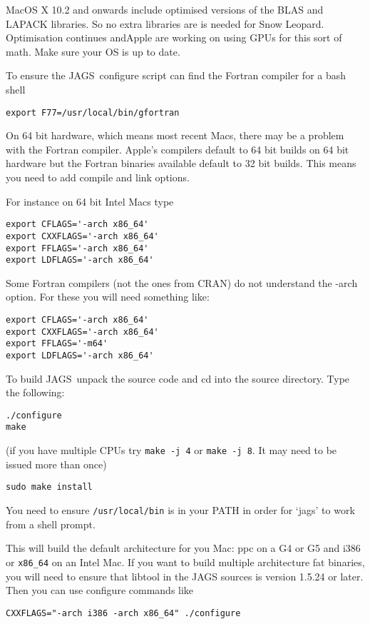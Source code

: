 \documentclass[11pt, a4paper, titlepage]{article}
\newcommand{\JAGS}{\textsf{JAGS}}
\begin{document}
MacOS X 10.2 and onwards include optimised versions of the BLAS and
LAPACK libraries.  So no extra libraries are is needed for Snow
Leopard.  Optimisation continues andApple are working on using GPUs
for this sort of math.  Make sure your OS is up to date.

To ensure the \JAGS\ configure script can find the Fortran compiler
for a bash shell
\begin{verbatim}
export F77=/usr/local/bin/gfortran
\end{verbatim}

On 64 bit hardware, which means most recent Macs, there may be a 
problem with the Fortran compiler.  Apple's compilers default to 64 bit 
builds on 64 bit hardware but the Fortran binaries available default to 
32 bit builds. This means you need to add compile and link options.

For instance on 64 bit Intel Macs type
\begin{verbatim}
export CFLAGS='-arch x86_64'
export CXXFLAGS='-arch x86_64'
export FFLAGS='-arch x86_64'
export LDFLAGS='-arch x86_64'
\end{verbatim}

Some Fortran compilers (not the ones from CRAN) do not understand 
the -arch option. For these you will need something like:
\begin{verbatim}
export CFLAGS='-arch x86_64'
export CXXFLAGS='-arch x86_64'
export FFLAGS='-m64'
export LDFLAGS='-arch x86_64'
\end{verbatim}

To build \JAGS\ unpack the source code and cd into the source  
directory. Type the following:
\begin{verbatim}
./configure
make
\end{verbatim}
(if you have multiple CPUs try \verb+make -j 4+ or
\verb+make -j 8+. It may need to be issued more than once)
\begin{verbatim}
sudo make install
\end{verbatim}

You need to ensure \texttt{/usr/local/bin} is in your PATH in order
for `jags' to work from a shell prompt.

This will build the default architecture for you Mac: ppc on a G4 or
G5 and i386 or \verb+x86_64+ on an Intel Mac.  If you want to build
multiple architecture fat binaries, you will need to ensure that
libtool in the JAGS sources is version 1.5.24 or later.  Then you can
use configure commands like
\begin{verbatim}
CXXFLAGS="-arch i386 -arch x86_64" ./configure
\end{verbatim}
\end{document}
